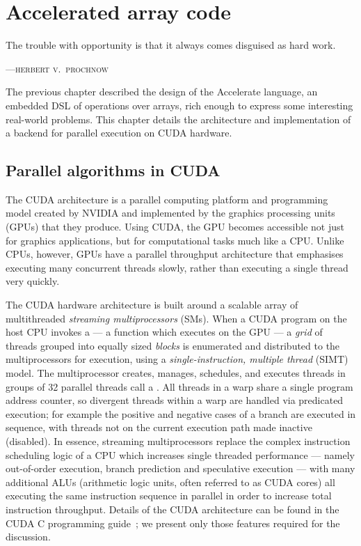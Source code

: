 
\chapter{Accelerated array code}
\label{ch:implementation}
\epigraph{The trouble with opportunity is that it always comes disguised as hard work.}%
{\textsc{---herbert v.\ prochnow}}

The previous chapter described the design of the Accelerate language, an
embedded DSL of operations over arrays, rich enough to express some interesting
real-world problems. This chapter details the architecture and implementation of
a backend for parallel execution on CUDA hardware.


\section{Parallel algorithms in CUDA}
\label{sec:parallel_algorithms_in_cuda}

The CUDA architecture is a parallel computing platform and programming model
created by NVIDIA and implemented by the graphics processing units
(GPUs)
that they produce. Using CUDA, the GPU becomes accessible not just for
graphics applications, but for computational tasks much like a CPU\@. Unlike
CPUs, however, GPUs have a parallel throughput architecture that emphasises
executing many concurrent threads slowly, rather than executing a single thread
very quickly.

The CUDA hardware architecture is built around a scalable array of
multithreaded \emph{streaming multiprocessors} (SMs). When a CUDA program on the
host CPU invokes a  --- a function which executes on the GPU
--- a \emph{grid} of threads grouped into equally sized \emph{blocks} is
enumerated and distributed to the multiprocessors for execution, using a
\emph{single-instruction, multiple thread} (SIMT) model. The
multiprocessor creates, manages, schedules, and executes threads in groups of 32
parallel threads call a . All threads in a warp share a single
program address counter, so divergent threads within a warp are handled via
predicated execution; for example the positive and negative cases of a branch
are executed in sequence, with threads not on the current execution path made
inactive (disabled). In essence, streaming multiprocessors replace the complex
instruction scheduling logic of a CPU which increases single threaded
performance --- namely out-of-order execution, branch prediction and speculative
execution --- with many additional ALUs (arithmetic logic units, often referred
to as CUDA cores) all executing the same instruction sequence in parallel in
order to increase total instruction throughput. Details of the CUDA
architecture can be found in the CUDA C programming
guide~\cite{NVIDIA:2012wf}; we present only those features required for the
discussion.

